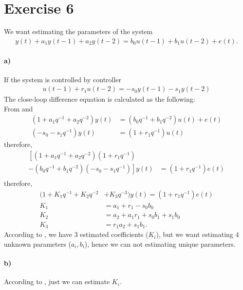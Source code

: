 \section*{Exercise 6}
We want estimating the parameters of the system
\begin{align} \label{eq.33}
    y(t) + a_1y(t-1) + a_2y(t-2)=b_0u(t-1)+b_1u(t-2) +e(t).
\end{align}
\paragraph{a)} If the system is controlled by controller
\begin{align} \label{eq.34}
    u(t-1)+r_1u(t-2)=-s_0y(t-1)-s_1y(t-2)
\end{align}
The close-loop difference equation is calculated as the following:\\
From  and 
\begin{align*}
    (1+a_1q^{-1}+a_2q^{-2})y(t) &= (b_0q^{-1}+b_1q^{-2})u(t) + e(t)\\
    (-s_0-s_1q^{-1})y(t) &= (1+r_1q^{-1})u(t)
\end{align*}
therefore,
\begin{align*}
    \left[(1+a_1q^{-1}+a_2q^{-2})(1+r_1q^{-1})\right.& \\
    \left. - (b_0q^{-1}+b_1q^{-2})(-s_0-s_1q^{-1})\right]y(t) &= (1+r_1q^{-1})e(t)\\
\end{align*}
therefore,
\begin{align} \label{eq.35}
    (1 + K_1q^{-1} + K_2q^{-2} &+ K_3q^{-3})y(t) = (1+r_1q^{-1})e(t)\\
    K_1 &= a_1 + r_1 -s_0b_0\nonumber\\
    K_2 &= a_2 + a_1r_1 + s_0b_1 + s_1b_0\nonumber\\
    K_3 &= r_1a_2 + s_1b_1.\nonumber
\end{align}
According to , we have 3 estimated coefficients ($K_i$), but we want estimating 4 unknown parameters ($a_i, b_i$), hence we can not estimating unique parameters.
\paragraph{b)} According to , just we can estimate $K_i$.
